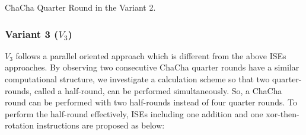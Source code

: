 \begin{algorithm}
	\BlankLine
	\caption{ChaCha Quarter Round in the Variant 2.}
	\label{alg::qr::v3}
\end{algorithm}

\subsubsection{Variant 3 ($V_3$)}
$V_3$ follows a parallel oriented approach which is different from the above ISEs approaches. By observing two consecutive ChaCha quarter rounds have a similar computational structure, we investigate a calculation scheme so that two quarter-rounds, called a half-round, can be performed simultaneously. So, a ChaCha round can be performed with two half-rounds instead of four quarter rounds. To perform the half-round effectively, ISEs including one addition and one xor-then-rotation instructions are proposed as below:   

